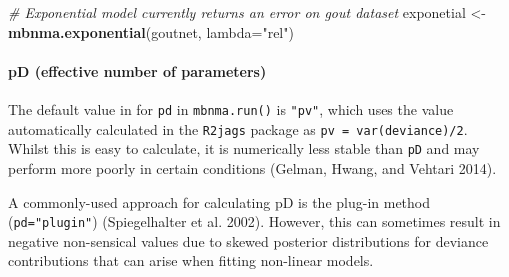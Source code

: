 \documentclass[]{article}
\newenvironment{Shaded}{\begin{snugshade}}{\end{snugshade}}
\newcommand{\CommentTok}[1]{\textcolor[rgb]{0.56,0.35,0.01}{\textit{#1}}}
\newcommand{\DataTypeTok}[1]{\textcolor[rgb]{0.13,0.29,0.53}{#1}}
\newcommand{\DecValTok}[1]{\textcolor[rgb]{0.00,0.00,0.81}{#1}}
\newcommand{\KeywordTok}[1]{\textcolor[rgb]{0.13,0.29,0.53}{\textbf{#1}}}
\newcommand{\NormalTok}[1]{#1}
\newcommand{\OperatorTok}[1]{\textcolor[rgb]{0.81,0.36,0.00}{\textbf{#1}}}
\newcommand{\StringTok}[1]{\textcolor[rgb]{0.31,0.60,0.02}{#1}}
\let\oldparagraph\paragraph
\renewcommand{\paragraph}[1]{\oldparagraph{#1}\mbox{}}
\begin{document}
\begin{Shaded}
\begin{Highlighting}[]
\CommentTok{# Exponential model currently returns an error on gout dataset}
\NormalTok{exponetial <-}\StringTok{ }\KeywordTok{mbnma.exponential}\NormalTok{(goutnet, }\DataTypeTok{lambda=}\StringTok{"rel"}\NormalTok{)}
\end{Highlighting}
\end{Shaded}

\begin{Shaded}
\end{Shaded}

\hypertarget{pd-effective-number-of-parameters}{%
\paragraph{pD (effective number of
parameters)}\label{pd-effective-number-of-parameters}}

The default value in for \texttt{pd} in \texttt{mbnma.run()} is
\texttt{"pv"}, which uses the value automatically calculated in the
\texttt{R2jags} package as \texttt{pv\ =\ var(deviance)/2}. Whilst this
is easy to calculate, it is numerically less stable than \texttt{pD} and
may perform more poorly in certain conditions (Gelman, Hwang, and
Vehtari 2014).

A commonly-used approach for calculating pD is the plug-in method
(\texttt{pd="plugin"}) (Spiegelhalter et al. 2002). However, this can
sometimes result in negative non-sensical values due to skewed posterior
distributions for deviance contributions that can arise when fitting
non-linear models.
\end{document}
